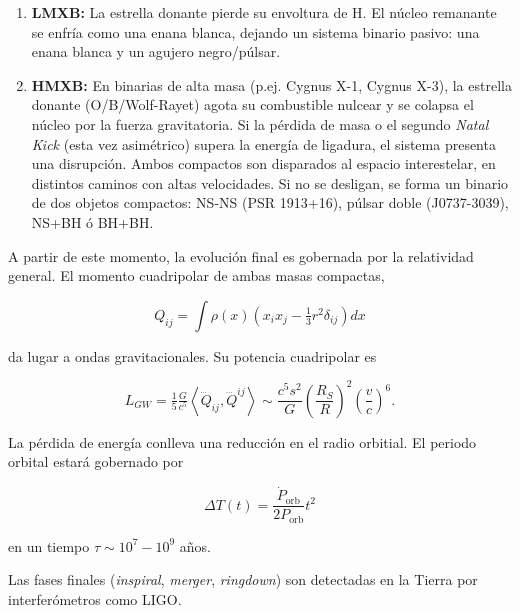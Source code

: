 \begin{enumerate}
  \item \textbf{LMXB:} La estrella donante pierde su envoltura de $\mbox{H}$. El núcleo remanante se enfría como una enana blanca, dejando un sistema binario pasivo: una enana blanca y un agujero negro/púlsar.
  \item \textbf{HMXB:} En binarias de alta masa (p.ej. Cygnus X-1, Cygnus X-3), la estrella donante (O/B/Wolf-Rayet) agota su combustible nulcear y se colapsa el núcleo por la fuerza gravitatoria. Si la pérdida de masa o el segundo \textit{Natal Kick} (esta vez asimétrico) supera la energía de ligadura, el sistema presenta una disrupción. Ambos compactos son disparados al espacio interestelar, en distintos caminos con altas velocidades. Si no se desligan, se forma un binario de dos objetos compactos: NS-NS (PSR 1913+16), púlsar doble (J0737-3039), NS+BH ó BH+BH.
\end{enumerate}

\noindent A partir de este momento, la evolución final es gobernada por la relatividad general. El momento cuadripolar de ambas masas compactas,

\begin{equation}
  Q_{ij}=\int\rho(x)(x_ix_j-\tfrac{1}{3}r^2\delta_{ij})dx
\end{equation}

\noindent da lugar a ondas gravitacionales. Su potencia cuadripolar es

\begin{equation}
  L_{GW}=\tfrac{1}{5}\tfrac{G}{c^5}\left\langle \dddot{Q}_{ij}, \dddot{Q}^{ij}\right\rangle\sim \frac{c^5s^2}{G}\left(\frac{R_S}{R}\right)^2\left(\frac{v}{c}\right)^6.
\end{equation}

\noindent La pérdida de energía conlleva una reducción en el radio orbitial. El periodo orbital estará gobernado por

\begin{equation}
  \Delta T(t)=\frac{\dot{P}_{\mbox{orb}}}{2P_{\mbox{orb}}}t^2
\end{equation}

\noindent en un tiempo $\tau\sim10^7-10^9$ años. 

Las fases finales (\textit{inspiral}, \textit{merger}, \textit{ringdown}) son detectadas en la Tierra por interferómetros como LIGO.


